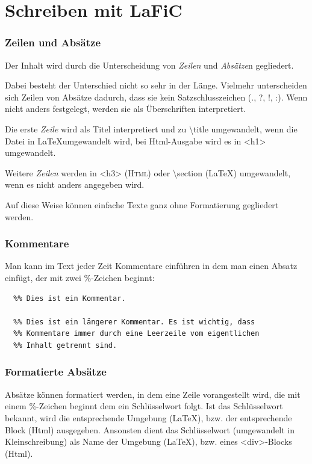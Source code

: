 \documentclass{scrartcl}
\begin{document}
\part{Schreiben mit LaFiC}

\section{Zeilen und Absätze}

Der Inhalt wird durch die Unterscheidung von  \emph{Zeilen} und
\emph{Absätze}n gegliedert.

Dabei besteht der Unterschied nicht so sehr in der
Länge. Vielmehr unterscheiden sich Zeilen von Absätze
dadurch, dass sie kein Satzschlusszeichen (., ?, !, :).
Wenn nicht anders festgelegt, werden sie als Überschriften
interpretiert.

Die erste \emph{Zeile} wird als Titel interpretiert und zu \textbackslash title
umgewandelt, wenn die Datei in \LaTeX umgewandelt wird, bei
Html-Ausgabe wird es in <h1> umgewandelt.

Weitere \emph{Zeilen} werden in <h3> (\textsc{Html}) oder \textbackslash section
(LaTeX) umgewandelt, wenn es nicht anders angegeben wird.

Auf diese Weise können einfache Texte ganz ohne Formatierung
gegliedert werden.

\section{Kommentare}

Man kann im Text jeder Zeit Kommentare einführen in dem man einen Absatz einfügt, der mit zwei \%-Zeichen beginnt:

\begin{verbatim}
  %% Dies ist ein Kommentar.

  %% Dies ist ein längerer Kommentar. Es ist wichtig, dass
  %% Kommentare immer durch eine Leerzeile vom eigentlichen
  %% Inhalt getrennt sind.

\end{verbatim}



\section{Formatierte Absätze}

Absätze können formatiert werden, in dem eine Zeile
vorangestellt wird, die mit einem \%-Zeichen beginnt dem ein
Schlüsselwort folgt. Ist das Schlüsselwort bekannt, wird
die entsprechende Umgebung (LaTeX), bzw. der entsprechende
Block (Html) ausgegeben. Ansonsten dient das Schlüsselwort
(umgewandelt in Kleinschreibung) als Name der Umgebung
(LaTeX), bzw. eines <div>-Blocks (Html).
\end{document}
